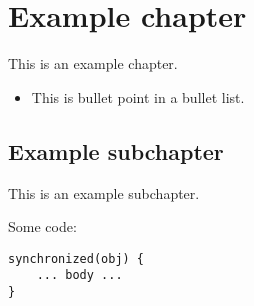 \section{Example chapter}
This is an example chapter.
\begin{itemize}
    \item This is bullet point in a bullet list.
\end{itemize}

\subsection{Example subchapter}
This is an example subchapter.

Some code:
\begin{lstlisting}
synchronized(obj) {
    ... body ...
}
\end{lstlisting}